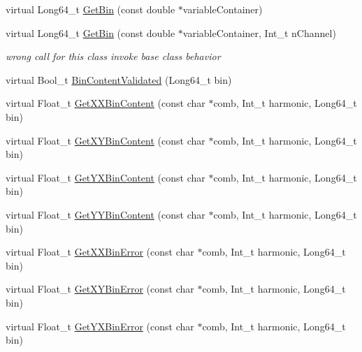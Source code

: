 \begin{DoxyCompactItemize}
virtual Long64\+\_\+t \mbox{\hyperlink{classQn_1_1CorrectionProfile3DCorrelations_ad0e08d2b05447c1dbd10f2a8b55b840a}{Get\+Bin}} (const double $\ast$variable\+Container)
\item 
\mbox{\label{classQn_1_1CorrectionProfile3DCorrelations_ae46e3ba4225d3640de7c2e5da8882c9f}} 
virtual Long64\+\_\+t \mbox{\hyperlink{classQn_1_1CorrectionProfile3DCorrelations_ae46e3ba4225d3640de7c2e5da8882c9f}{Get\+Bin}} (const double $\ast$variable\+Container, Int\+\_\+t n\+Channel)
\begin{DoxyCompactList}\small\item\em wrong call for this class invoke base class behavior \end{DoxyCompactList}\item 
virtual Bool\+\_\+t \mbox{\hyperlink{classQn_1_1CorrectionProfile3DCorrelations_ad771201bd096e4e9bd028891baa032d9}{Bin\+Content\+Validated}} (Long64\+\_\+t bin)
\item 
virtual Float\+\_\+t \mbox{\hyperlink{classQn_1_1CorrectionProfile3DCorrelations_a1e51dc8db1fdfde5e6e5557bd87167e1}{Get\+X\+X\+Bin\+Content}} (const char $\ast$comb, Int\+\_\+t harmonic, Long64\+\_\+t bin)
\item 
virtual Float\+\_\+t \mbox{\hyperlink{classQn_1_1CorrectionProfile3DCorrelations_a8727b0b441c370f21a89ac507c049fdb}{Get\+X\+Y\+Bin\+Content}} (const char $\ast$comb, Int\+\_\+t harmonic, Long64\+\_\+t bin)
\item 
virtual Float\+\_\+t \mbox{\hyperlink{classQn_1_1CorrectionProfile3DCorrelations_a1ac93d3f7efb198491199728065e687b}{Get\+Y\+X\+Bin\+Content}} (const char $\ast$comb, Int\+\_\+t harmonic, Long64\+\_\+t bin)
\item 
virtual Float\+\_\+t \mbox{\hyperlink{classQn_1_1CorrectionProfile3DCorrelations_a7a58783cf79eeacf32370fc424a587a4}{Get\+Y\+Y\+Bin\+Content}} (const char $\ast$comb, Int\+\_\+t harmonic, Long64\+\_\+t bin)
\item 
virtual Float\+\_\+t \mbox{\hyperlink{classQn_1_1CorrectionProfile3DCorrelations_abbb27758a2f9b4c82d057e405e27fdd5}{Get\+X\+X\+Bin\+Error}} (const char $\ast$comb, Int\+\_\+t harmonic, Long64\+\_\+t bin)
\item 
virtual Float\+\_\+t \mbox{\hyperlink{classQn_1_1CorrectionProfile3DCorrelations_aeb58a03c96909827494763fd4dd44e30}{Get\+X\+Y\+Bin\+Error}} (const char $\ast$comb, Int\+\_\+t harmonic, Long64\+\_\+t bin)
\item 
virtual Float\+\_\+t \mbox{\hyperlink{classQn_1_1CorrectionProfile3DCorrelations_ac26f18268f0f9c6398ec5491133219dd}{Get\+Y\+X\+Bin\+Error}} (const char $\ast$comb, Int\+\_\+t harmonic, Long64\+\_\+t bin)

\end{DoxyCompactItemize}
